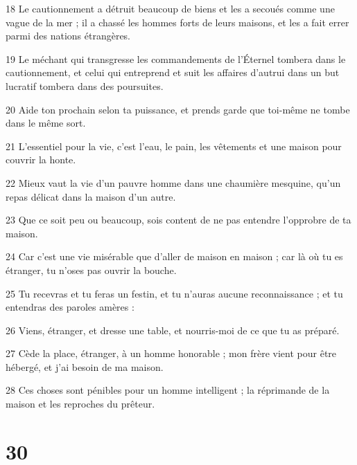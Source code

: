 \par 18 Le cautionnement a détruit beaucoup de biens et les a secoués comme une vague de la mer ; il a chassé les hommes forts de leurs maisons, et les a fait errer parmi des nations étrangères.
\par 19 Le méchant qui transgresse les commandements de l'Éternel tombera dans le cautionnement, et celui qui entreprend et suit les affaires d'autrui dans un but lucratif tombera dans des poursuites.
\par 20 Aide ton prochain selon ta puissance, et prends garde que toi-même ne tombe dans le même sort.
\par 21 L'essentiel pour la vie, c'est l'eau, le pain, les vêtements et une maison pour couvrir la honte.
\par 22 Mieux vaut la vie d'un pauvre homme dans une chaumière mesquine, qu'un repas délicat dans la maison d'un autre.
\par 23 Que ce soit peu ou beaucoup, sois content de ne pas entendre l'opprobre de ta maison.
\par 24 Car c'est une vie misérable que d'aller de maison en maison ; car là où tu es étranger, tu n'oses pas ouvrir la bouche.
\par 25 Tu recevras et tu feras un festin, et tu n'auras aucune reconnaissance ; et tu entendras des paroles amères :
\par 26 Viens, étranger, et dresse une table, et nourris-moi de ce que tu as préparé.
\par 27 Cède la place, étranger, à un homme honorable ; mon frère vient pour être hébergé, et j'ai besoin de ma maison.
\par 28 Ces choses sont pénibles pour un homme intelligent ; la réprimande de la maison et les reproches du prêteur.

\chapter{30}

